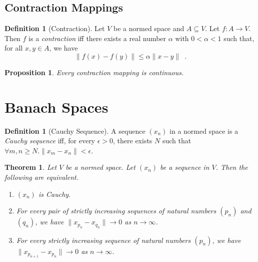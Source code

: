 \documentclass{book}
\newtheorem{prop}[ax]{Proposition}
\newtheorem{thm}[ax]{Theorem}
\theoremstyle{definition}
\newtheorem{df}[ax]{Definition}
\begin{document}
\subsection{Contraction Mappings}

\begin{df}[Contraction]
Let $V$ be a normed space and $A \subseteq V$. Let $f : A \rightarrow V$. Then $f$ is a \emph{contraction} iff there exists a real number $\alpha$ with $0 < \alpha < 1$ such that, for all $x,y \in A$, we have
\[ \| f(x) - f(y) \| \leq \alpha \| x - y \| \enspace . \]
\end{df}

\begin{prop}
Every contraction mapping is continuous.
\end{prop}

\section{Banach Spaces}

\begin{df}[Cauchy Sequence]
A sequence $(x_n)$ in a normed space is a \emph{Cauchy sequence} iff, for every $\epsilon > 0$, there exists $N$ such that $\forall m,n \geq N. \| x_m - x_n \| < \epsilon$.
\end{df}

\begin{thm}
\label{thm:Cauchy}
Let $V$ be a normed space. Let $(x_n)$ be a sequence in $V$. Then the following are equivalent.
\begin{enumerate}
\item $(x_n)$ is Cauchy.
\item For every pair of strictly increasing sequences of natural numbers $(p_n)$ and $(q_n)$, we have $\| x_{p_n} - x_{q_n} \| \rightarrow 0$ as $n \rightarrow \infty$.
\item For every strictly increasing sequence of natural numbers $(p_n)$, we have $\| x_{p_{n+1}} - x_{p_n} \| \rightarrow 0$ as $n \rightarrow \infty$.
\end{enumerate}
\end{thm}
\end{document}
